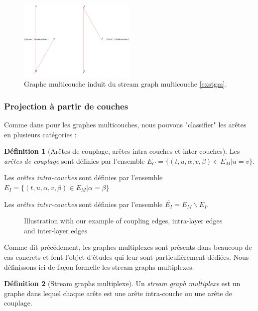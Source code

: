 \documentclass[11pt,a4paper]{article}
\theoremstyle{definition}
\newtheorem{defn}{Définition}
\theoremstyle{remark}
\theoremstyle{remark}
\def \stg {stream graph}
\def \Stgs {Stream graphs}
\def \stgm {stream graph multicouche}
\def \stgs {stream graphs}
\begin{document}
    \begin{figure}[H]
    	\centering
    	\includegraphics[width=0.5\textwidth]{extrt010.png}
    	\caption{Graphe multicouche induit du \stgm{} \ref{exstgm}.}
    \end{figure}
	


\subsubsection{Projection à partir de couches}
Comme dans \cite{mlkiv} pour les graphes multicouches, nous pouvons "classifier" les arêtes en plusieurs catégories :
	
	\begin{defn}[Arêtes de couplage, arêtes intra-couches et inter-couches]

   	Les {\em arêtes de couplage} sont définies par l'ensemble $E_C=\{(t,u,\alpha,v,\beta)\in E_M | u=v\}$.

    Les {\em arêtes intra-couches} sont définies par l'ensemble $E_I = \{(t,u,\alpha,v,\beta) \in E_M | \alpha = \beta \}$

    Les {\em arêtes inter-couches} sont définies par l'ensemble $\bar{E_I} = E_M\backslash E_I$.
    
	
	\end{defn}	
	
	\begin{figure}[h]
		\centering
		\caption{Illustration with our example of coupling edges, intra-layer edges and inter-layer edges}
		\label{exIntraInter}
	\end{figure}
	
	
	Comme dit précédement, les graphes multiplexes sont présents dans beaucoup de cas concrets et font l'objet d'études qui leur sont particulièrement dédiées. Nous définissons ici de façon formelle les \stgs{} multiplexes.
	
	\begin{defn}[\Stgs{} multiplexe]	
	Un {\em \stg{} multiplexe} est un graphe dans lequel chaque arête est une arête intra-couche ou une arête de couplage.
	\end{defn}
	
\end{document}
